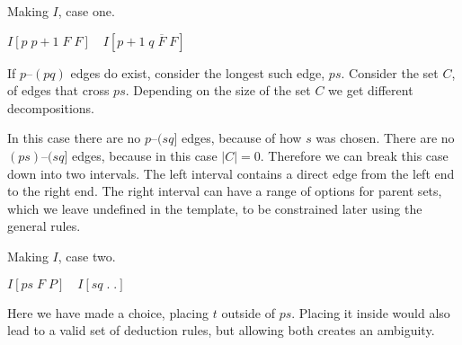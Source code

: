 \begin{finalEquation}
\caption{Making $I$, case one.}
  $I[p \; p{+}1 \; F \; F] \quad I[p{+}1 \; q \; \overline{F} \; F]$
\end{finalEquation}

If $p$--$(pq)$ edges do exist, consider the longest such edge, $ps$.
Consider the set $C$, of edges that cross $ps$.
Depending on the size of the set $C$ we get different decompositions.

\begin{center}
\end{center}

In this case there are no $p$--$(sq]$ edges, because of how $s$ was chosen.
There are no $(ps)$--$(sq]$ edges, because in this case $|C| = 0$.
Therefore we can break this case down into two intervals.
The left interval contains a direct edge from the left end to the right end.
The right interval can have a range of options for parent sets, which we leave undefined in the template, to be constrained later using the general rules.

\begin{finalEquation}
\caption{Making $I$, case two.}
  $I[ps \; F \; P] \quad I[sq \; . \; .]$
\end{finalEquation}

\begin{center}
\end{center}

Here we have made a choice, placing $t$ outside of $ps$.
Placing it inside would also lead to a valid set of deduction rules, but allowing both creates an ambiguity.

